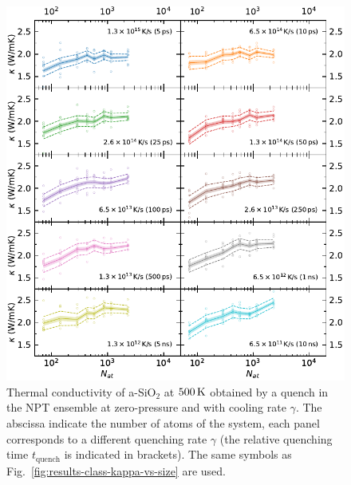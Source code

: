 \vspace{-1cm}
\begin{figure}[!htb]
    \centering
    \includegraphics[width=\textwidth]{chapters/appendix/figures/Silica_NPT_kappa_NATconv_tesi.pdf}
    \caption{Thermal conductivity of a-SiO$_2$ at $500\,\mathrm{K}$ obtained by a quench in the NPT ensemble at zero-pressure and with cooling rate $\gamma$. 
    The abscissa indicate the number of atoms of the system, each panel corresponds to a different quenching rate $\gamma$ (the relative quenching time $t_\mathrm{quench}$ is indicated in brackets). 
    The same symbols as Fig.~\ref{fig:results-class-kappa-vs-size} are used.
    }
    \label{fig:appendix-silica-class-npt-kappa-vs-size}
\end{figure}

